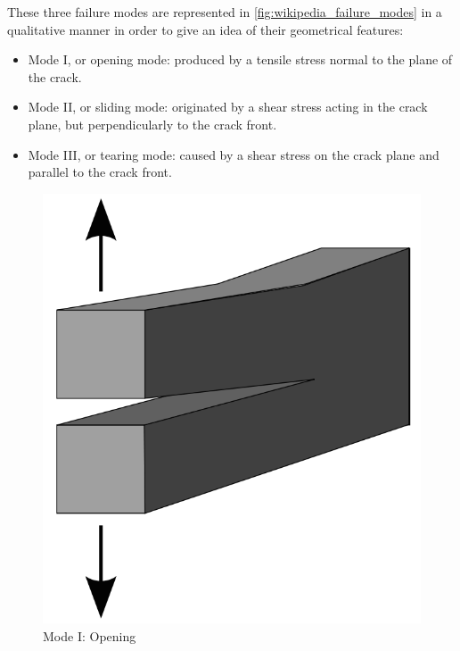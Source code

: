 \documentclass[cmfonts]{witpress}
\begin{document}
These three failure modes are represented in \cref{fig:wikipedia_failure_modes} in a qualitative manner in order to give an idea of their geometrical features:
\begin{itemize}
	\item Mode I, or opening mode: produced by a tensile stress normal to the plane of the crack.

	\item Mode II, or sliding mode: originated by a shear stress acting in the crack plane, but perpendicularly to the crack front.

	\item Mode III, or tearing mode: caused by a shear stress on the crack plane and parallel to the crack front.
\end{itemize}

\begin{figure}
\centering
\begin{minipage}[b]{.3\columnwidth}
	\centering
	\includegraphics[width=\columnwidth]{figures/IMG_CUTRES/wikipedia_failure_modes_1}
			Mode I:	Opening
\end{minipage}
\hfill
\begin{minipage}[b]{.3\columnwidth}

\end{minipage}
\end{figure}
\end{document}
